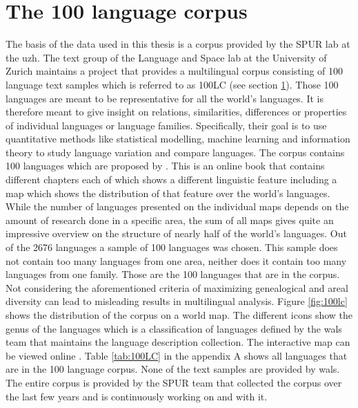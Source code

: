 \section{The 100 language corpus}
\label{sec:corpus}
The basis of the data used in this thesis is a corpus provided by the SPUR lab at the \ac{uzh}. The text group of the Language and Space lab at the University of Zurich maintains a project that provides a multilingual corpus consisting of 100 language text samples \citep{UniversityofZurich.19.07.2021} which is referred to as 100LC (see section \ref{sec:corpus}). Those 100 languages are meant to be representative for all the world's languages. It is therefore meant to give insight on relations, similarities, differences or properties of individual languages or language families. Specifically, their goal is to use quantitative methods like statistical modelling, machine learning and information theory to study language variation and compare languages. The corpus contains 100 languages which are proposed by \citet{Comrie&Dryer.2013}. This is an online book that contains different chapters each of which shows a different linguistic feature including a map which shows the distribution of that feature over the world's languages. While the number of languages presented on the individual maps depends on the amount of research done in a specific area, the sum of all maps gives quite an impressive overview on the structure of nearly half of the world's languages. Out of the 2676 languages a sample of 100 languages was chosen. This sample does not contain too many languages from one area, neither does it contain too many languages from one family. Those are the 100 languages that are in the corpus. Not considering the aforementioned criteria of maximizing genealogical and areal diversity can lead to misleading results in multilingual analysis. Figure \ref{fig:100lc} shows the distribution of the corpus on a world map. The different icons show the genus of the languages which is a classification of languages defined by the \ac{wals} team that maintains the language description collection. The interactive map can be viewed online \citep{100LC.21.07.2021}. Table \ref{tab:100LC} in the appendix A shows all languages that are in the 100 language corpus. None of the text samples are provided by \ac{wals}. The entire corpus is provided by the SPUR team that collected the corpus over the last few years and is continuously working on and with it.


